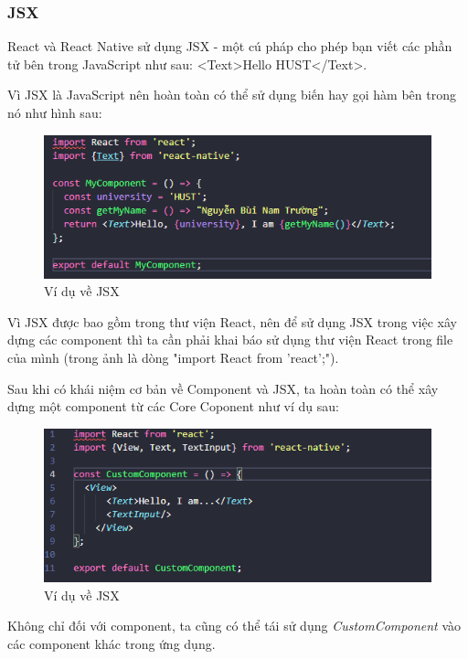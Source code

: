 \subsubsection{JSX}
    React và React Native sử dụng JSX - một cú pháp cho phép bạn viết các phần tử bên trong JavaScript như sau: <Text>Hello HUST</Text>.

    Vì JSX là JavaScript nên hoàn toàn có thể sử dụng biến hay gọi hàm bên trong nó như hình sau:
    \begin{figure}[!ht]
        \centering
        \includegraphics[width=1\textwidth]{images/JSX.png}
        \caption{Ví dụ về JSX}
    \end{figure}

    Vì JSX được bao gồm trong thư viện React, nên để sử dụng JSX trong việc xây dựng các component thì ta cần phải khai báo sử dụng thư viện React trong file của mình (trong ảnh là dòng "import React from 'react';").

    Sau khi có khái niệm cơ bản về Component và JSX, ta hoàn toàn có thể xây dựng một component từ các Core Coponent như ví dụ sau:
    \begin{figure}[!ht]
        \centering
        \includegraphics[width=1\textwidth]{images/customComponent.png}
        \caption{Ví dụ về JSX}
    \end{figure}

    Không chỉ đối với component, ta cũng có thể tái sử dụng \textit{CustomComponent} vào các component khác trong ứng dụng.
